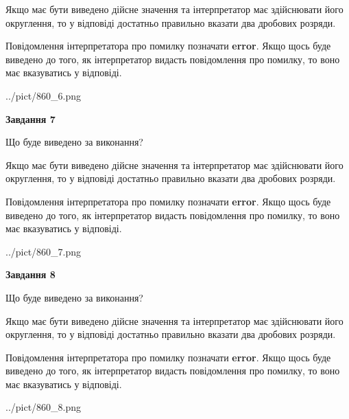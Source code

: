 \documentclass[12pt, ukrainian]{article}
\begin{document}
{\begin {Large}
Якщо має бути виведено дійсне значення та інтерпретатор має здійснювати його округлення, 
то у відповіді достатньо правильно вказати два дробових розряди.

Повідомлення інтерпретатора про помилку позначати \textbf{error}.
Якщо щось буде виведено до того, як інтерпретатор видасть повідомлення про помилку, 
то воно має вказуватись у відповіді. \par

\begin{center}
	{../pict/860_6.png}
\end{center}
\newpage

{\begin {center}\textbf{Завдання 7}\end {center}}\par
Що буде виведено за виконання? \par

Якщо має бути виведено дійсне значення та інтерпретатор має здійснювати його округлення, 
то у відповіді достатньо правильно вказати два дробових розряди.

Повідомлення інтерпретатора про помилку позначати \textbf{error}.
Якщо щось буде виведено до того, як інтерпретатор видасть повідомлення про помилку, 
то воно має вказуватись у відповіді. \par

\begin{center}
	{../pict/860_7.png}
\end{center}
\newpage

{\begin {center}\textbf{Завдання 8}\end {center}}\par
Що буде виведено за виконання? \par

Якщо має бути виведено дійсне значення та інтерпретатор має здійснювати його округлення, 
то у відповіді достатньо правильно вказати два дробових розряди.

Повідомлення інтерпретатора про помилку позначати \textbf{error}.
Якщо щось буде виведено до того, як інтерпретатор видасть повідомлення про помилку, 
то воно має вказуватись у відповіді. \par

\begin{center}
	{../pict/860_8.png}
\end{center}
\newpage


\end{Large}}
\end{document}

